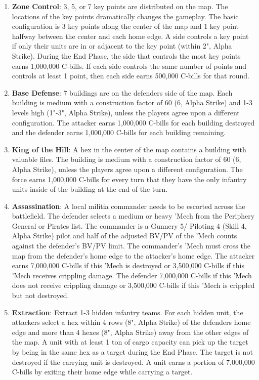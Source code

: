 \begin{enumerate}
\item {\bfseries Zone Control}: 3, 5, or 7 key points are distributed on the map.
The locations of the key points dramatically changes the gameplay.
The basic configuration is 3 key points along the center of the map and 1 key point halfway between the center and each home edge.
A side controls a key point if only their units are in or adjacent to the key point (within 2", Alpha Strike).
During the End Phase, the side that controls the most key points earns 1,000,000 C-bills.
If each side controls the same number of points and controls at least 1 point, then each side earns 500,000 C-bills for that round.

\item {\bfseries Base Defense}: 7 buildings are on the defenders side of the map.
Each building is medium with a construction factor of 60 (6, Alpha Strike) and 1-3 levels high (1"-3", Alpha Strike), unless the players agree upon a different configuration.
The attacker earns 1,000,000 C-bills for each building destroyed and the defender earns 1,000,000 C-bills for each building remaining.

\item {\bfseries King of the Hill}: A hex in the center of the map contains a building with valuable files.
The building is medium with a construction factor of 60 (6, Alpha Strike), unless the players agree upon a different configuration.
The force earns 1,000,000 C-bills for every turn that they have the only infantry units inside of the building at the end of the turn.

\item {\bfseries Assassination}: A local militia commander needs to be escorted across the battlefield.
The defender selects a medium or heavy 'Mech from the Periphery General or Pirates list.
The commander is a Gunnery 5/ Piloting 4 (Skill 4, Alpha Strike) pilot and half of the adjusted BV/PV of the 'Mech counts against the defender's BV/PV limit.
The commander's 'Mech must cross the map from the defender's home edge to the attacker's home edge.
The attacker earns 7,000,000 C-bills if this 'Mech is destroyed or 3,500,000 C-bills if this 'Mech receives crippling damage.
The defender 7,000,000 C-bills if this 'Mech does not receive crippling damage or 3,500,000 C-bills if this 'Mech is crippled but not destroyed.

\item {\bfseries Extraction}: Extract 1-3 hidden infantry teams.
For each hidden unit, the attackers select a hex within 4 rows (8", Alpha Strike) of the defenders home edge and more than 4 hexes (8", Alpha Strike) away from the other edges of the map.
A unit with at least 1 ton of cargo capacity can pick up the target by being in the same hex as a target during the End Phase.
The target is not destroyed if the carrying unit is destroyed.
A unit earns a portion of 7,000,000 C-bills by exiting their home edge while carrying a target.


\end{enumerate}

